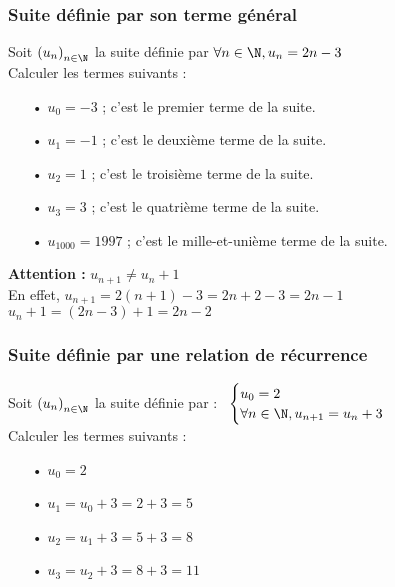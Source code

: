 \subsubsection{Suite définie par son terme général}

Soit $\left(u_n\right)_{n \in \N}$ la suite définie par $\forall n \in \N, u_n = 2n - 3$ \\

Calculer les termes suivants : \\

\begin{itemize}
\item[•] $u_0 = -3$ ; c'est le premier terme de la suite.
\item[•] $u_1 = -1$ ; c'est le deuxième terme de la suite.
\item[•] $u_2 = 1$ ; c'est le troisième terme de la suite.
\item[•] $u_3 = 3$ ; c'est le quatrième terme de la suite.
\item[•] $u_{1000} = 1997$ ; c'est le mille-et-unième terme de la suite.
\end{itemize}

\vspace*{.3cm}

\textbf{Attention : } $u_{n+1} \neq u_n + 1$ \\

En effet, $u_{n+1} = 2\left(n+1\right) -3 = 2n + 2 - 3 = 2n - 1 $ \\

$u_n + 1 = \left(2n - 3\right) + 1 = 2n - 2$

\newpage

\subsubsection{Suite définie par une relation de récurrence}

Soit $\left(u_n\right)_{n \in \N}$ la suite définie par :$ \; \; \; \begin{cases}
u_0 = 2 \\
\forall n \in \N, u_{n+1} = u_n + 3 \\
\end{cases}$ \\

Calculer les termes suivants : 

\begin{itemize}
\item[•] $u_0 = 2$
\item[•] $ u_1 = u_0 + 3 = 2 + 3 = 5$ 
\item[•] $ u_2 = u_1 + 3 = 5 + 3 = 8$ 
\item[•] $ u_3 = u_2 + 3 = 8 + 3 = 11$
\end{itemize}

